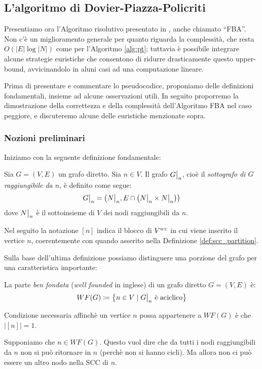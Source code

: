 \subsection{L'algoritmo di Dovier-Piazza-Policriti}
Presentiamo ora l'Algoritmo risolutivo presentato in \cite{dovier}, anche chiamato ``FBA''. Non c'è un miglioramento generale per quanto riguarda la complessità, che resta $O(|E| \log |N|)$ come per l'Algoritmo \ref{alg:pt}; tuttavia è possibile integrare alcune strategie euristiche che consentono di ridurre drasticamente questo upper-bound, avvicinandolo in aluni casi ad una computazione lineare.

Prima di presentare e commentare lo pseudocodice, proponiamo delle definizioni fondamentali, insieme ad alcune osservazioni utili. In seguito proporremo la dimostrazione della correttezza e della complessità dell'Algoritmo FBA nel caso peggiore, e discuteremo alcune delle euristiche menzionate sopra.

\subsubsection{Nozioni preliminari}
Iniziamo con la seguente definizione fondamentale:
\begin{definition}
    \label{def:grafo_restr}
    Sia $G = (V,E)$ un grafo diretto. Sia $n \in V$. Il grafo $\restr{G}{n}$, cioè il \emph{sottografo di $G$ raggiungibile da $n$}, è definito come segue:
    \begin{gather*}
        \restr{G}{n} = \left(\restr{N}{n}, E \cap \left(\restr{N}{n} \times \restr{N}{n}\right)\right)
    \end{gather*}
    dove $\restr{N}{n}$ è il sottoinsieme di $V$ dei nodi raggiungibili da $n$.
\end{definition}
Nel seguito la notazione $[n]$ indica il blocco di $V^{\superscc}$ in cui viene inserito il vertice $n$, coerentemente con quando asserito nella Definizione \ref{def:scc_partition}.

Sulla base dell'ultima definizione possiamo distinguere una porzione del grafo per una caratteristica importante:
\begin{definition}
    La parte \emph{ben fondata} (\emph{well founded} in inglese) di un grafo diretto $G = (V,E)$ è:
    \begin{gather*}
        WF(G) \coloneqq \left\{n \in V \mid \restr{G}{n} \text{ è aciclico}\right\}
    \end{gather*}
\end{definition}
\begin{observation}
    Condizione necessaria affinchè un vertice $n$ possa appartenere a $WF(G)$ è che $|[n]| = 1$.
\end{observation}
\begin{proof2}
    Supponiamo che $n \in WF(G)$. Questo vuol dire che da tutti i nodi raggiungibili da $n$ non si può ritornare in $n$ (perchè non si hanno cicli). Ma allora non ci può essere un altro nodo nella SCC di $n$.
\end{proof2}

